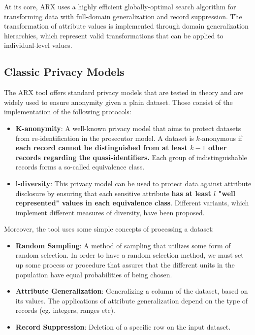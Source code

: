 At its core, ARX uses a highly efficient globally-optimal search algorithm for transforming data with full-domain generalization and record suppression. The transformation of attribute values is implemented through domain generalization hierarchies, which represent valid transformations that can be applied to individual-level values.

\subsection{Classic Privacy Models}

The ARX tool offers standard privacy models that are tested in theory and are widely used to ensure anonymity given a plain dataset. Those consist of the implementation of the following protocols:

\begin{itemize}
    \item \textbf{K-anonymity}: A well-known privacy model that aims to protect datasets from re-identification in the prosecutor model. A dataset is $k$-anonymous if\textbf{ each record cannot be distinguished from at least $k-1$ other records regarding the quasi-identifiers.} Each group of indistinguishable records forms a so-called equivalence class. 
    \item \textbf{l-diversity}: This privacy model can be used to protect data against attribute disclosure by ensuring that each sensitive attribute \textbf{has at least $l$ "well represented" values in each equivalence class}. Different variants, which implement different measures of diversity, have been proposed.
\end{itemize}

Moreover, the tool uses some simple concepts of processing a dataset:

\begin{itemize}
    \item \textbf{Random Sampling}: A method of sampling that utilizes some form of random selection. In order to have a random selection method, we must set up some process or procedure that assures that the different units in the population have equal probabilities of being chosen.
    \item \textbf{Attribute Generalization}: Generalizing a column of the dataset, based on its values. The applications of attribute generalization depend on the type of records (eg. integers, ranges etc).
    \item \textbf{Record Suppression}: Deletion of a specific row on the input dataset.
\end{itemize}

